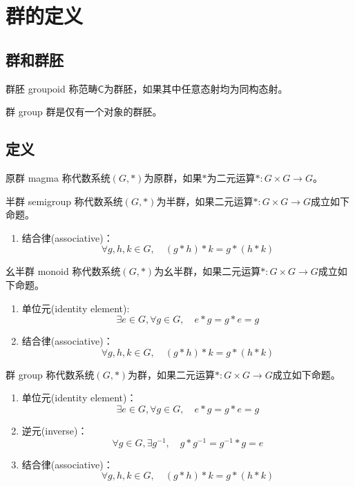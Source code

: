\section{群的定义}

\subsection{群和群胚}

\begin{definition}{群胚 groupoid}
	称范畴$\mathsf{C}$为群胚，如果其中任意态射均为同构态射。
\end{definition}

\begin{definition}{群 group}
	群是仅有一个对象的群胚。
\end{definition}

\subsection{定义}

\begin{definition}{原群 magma}
	称代数系统$(G,*)$为原群，如果$*$为二元运算$*:G\times G\to G$。
\end{definition}

\begin{definition}{半群 semigroup}
	称代数系统$(G,*)$为半群，如果二元运算$*:G\times G\to G$成立如下命题。
	\begin{enumerate}
		\item 结合律(associative)：
		$$
		\forall g,h,k\in G,\quad (g*h)*k=g*(h*k)
		$$
	\end{enumerate}
\end{definition}

\begin{definition}{幺半群 monoid}
	称代数系统$(G,*)$为幺半群，如果二元运算$*:G\times G\to G$成立如下命题。
	\begin{enumerate}
		\item 单位元(identity element):
		$$
		\exists e\in G,\forall g\in G,\quad e*g=g*e=g
		$$
		\item 结合律(associative)：
		$$
		\forall g,h,k\in G,\quad (g*h)*k=g*(h*k)
		$$
	\end{enumerate}
\end{definition}

\begin{definition}{群 group}
	称代数系统$(G,*)$为群，如果二元运算$*:G\times G\to G$成立如下命题。
	\begin{enumerate}
		\item 单位元(identity element)：
		$$
		\exists e\in G,\forall g\in G,\quad e*g=g*e=g
		$$
		\item 逆元(inverse)：$$
		\forall g\in G,\exists g^{-1},\quad g*g^{-1}=g^{-1}*g=e
		$$
		\item 结合律(associative)：
		$$
		\forall g,h,k\in G,\quad (g*h)*k=g*(h*k)
		$$
	\end{enumerate}
\end{definition}

